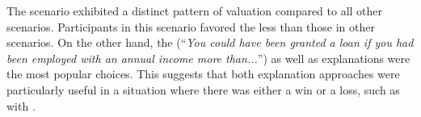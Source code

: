 The \loanN scenario exhibited a distinct pattern of valuation compared to all other scenarios. Participants in this scenario favored the \comp less than those in other scenarios. On the other hand, the \cf (``{\it You could have been granted a loan if you had been employed with an annual income more than...}'') as well as \cto explanations were the most popular choices. This suggests that both explanation approaches were particularly useful in a situation where there was either a win or a loss, such as with \loanN.